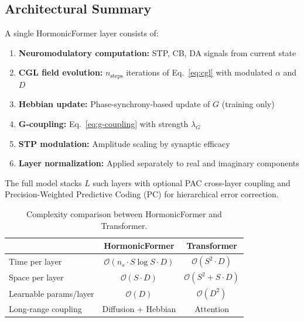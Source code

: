 \subsection{Architectural Summary}

A single HormonicFormer layer consists of:
\begin{enumerate}
\item \textbf{Neuromodulatory computation:} STP, CB, DA signals from current state
\item \textbf{CGL field evolution:} $n_{\mathrm{steps}}$ iterations of Eq.~\eqref{eq:cgl} with modulated $\alpha$ and $D$
\item \textbf{Hebbian update:} Phase-synchrony-based update of $G$ (training only)
\item \textbf{G-coupling:} Eq.~\eqref{eq:g-coupling} with strength $\lambda_G$
\item \textbf{STP modulation:} Amplitude scaling by synaptic efficacy
\item \textbf{Layer normalization:} Applied separately to real and imaginary components
\end{enumerate}

The full model stacks $L$ such layers with optional PAC cross-layer coupling and Precision-Weighted Predictive Coding (PC) for hierarchical error correction.

\begin{table}[h]
\centering
\caption{Complexity comparison between HormonicFormer and Transformer.}
\label{tab:complexity}
\begin{tabular}{lcc}
\toprule
& \textbf{HormonicFormer} & \textbf{Transformer} \\
\midrule
Time per layer & $\mathcal{O}(n_s \cdot S \log S \cdot D)$ & $\mathcal{O}(S^2 \cdot D)$ \\
Space per layer & $\mathcal{O}(S \cdot D)$ & $\mathcal{O}(S^2 + S \cdot D)$ \\
Learnable params/layer & $\mathcal{O}(D)$ & $\mathcal{O}(D^2)$ \\
Long-range coupling & Diffusion + Hebbian & Attention \\
\bottomrule
\end{tabular}
\end{table}
